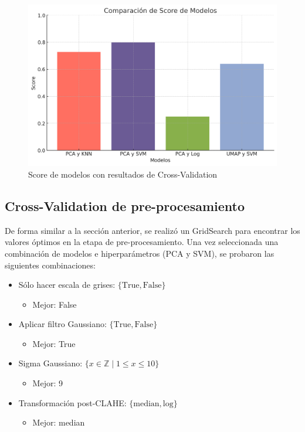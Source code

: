 \documentclass[journal]{IEEEtran}
\begin{document}
\begin{figure}[H]
        \centering
        \includegraphics[width=\linewidth]{figures/comparacion_modelos.png}
        \caption{Score de modelos con resultados de Cross-Validation}
        \label{fig:comparativa_modelos}
\end{figure}

\subsection{Cross-Validation de pre-procesamiento}
De forma similar a la sección anterior, se realizó un GridSearch para encontrar los valores óptimos en la etapa de pre-procesamiento. Una vez seleccionada una combinación de modelos e hiperparámetros (PCA y SVM), se probaron las siguientes combinaciones:

\begin{otherlanguage}{english}
        \begin{itemize}
                \item Sólo hacer escala de grises: \( \{ \text{True}, \text{False} \} \)
                \begin{itemize}
                        \item Mejor: False
                \end{itemize}
                \item Aplicar filtro Gaussiano: \( \{ \text{True}, \text{False} \} \)
                \begin{itemize}
                        \item Mejor: True
                \end{itemize}
                \item Sigma Gaussiano: \( \{ x \in \mathbb{Z} \mid 1 \leq x \leq 10 \} \)
                \begin{itemize}
                        \item Mejor: 9
                \end{itemize}
                \item Transformación post-CLAHE: \( \{ \text{median}, \text{log} \} \)
                \begin{itemize}
                        \item Mejor: median
                \end{itemize}
        \end{itemize}
\end{otherlanguage}
\end{document}
